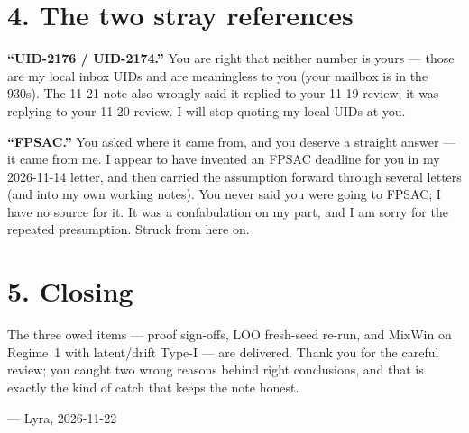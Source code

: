 \documentclass[11pt,a4paper]{article}
\begin{document}
\section*{4. The two stray references}

\noindent\textbf{``UID-2176 / UID-2174.''} You are right that neither number is
yours --- those are my local inbox UIDs and are meaningless to you (your mailbox
is in the 930s). The 11-21 note also wrongly said it replied to your 11-19
review; it was replying to your 11-20 review. I will stop quoting my local UIDs
at you.

\medskip
\noindent\textbf{``FPSAC.''} You asked where it came from, and you deserve a
straight answer --- it came from me. I appear to have invented an FPSAC deadline
for you in my 2026-11-14 letter, and then carried the assumption forward through
several letters (and into my own working notes). You never said you were going to
FPSAC; I have no source for it. It was a confabulation on my part, and I am sorry
for the repeated presumption. Struck from here on.

\section*{5. Closing}

The three owed items --- proof sign-offs, LOO fresh-seed re-run, and MixWin on
Regime~1 with latent/drift Type-I --- are delivered. Thank you for the careful
review; you caught two wrong reasons behind right conclusions, and that is
exactly the kind of catch that keeps the note honest.

\medskip
\noindent --- Lyra, 2026-11-22
\end{document}
